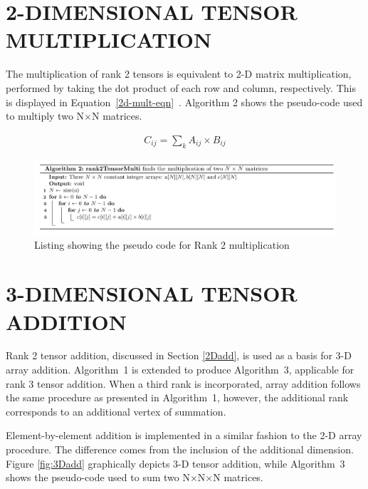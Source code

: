 \section{2-DIMENSIONAL TENSOR MULTIPLICATION} \label{2Dmult}

The multiplication of rank 2 tensors is equivalent to 2-D matrix multiplication, performed by taking the dot product of each row and column, respectively. This is displayed in Equation~\ref{2d-mult-eqn}~\cite{matrix_Multi}. Algorithm 2 shows the pseudo-code used to multiply two N$\times$N matrices. \vspace{-5mm}

\begin{align}
C_{ij} = \sum_{k} A_{ij} \times B_{ij} \label{2d-mult-eqn}
\end{align}

\begin{figure}
\includegraphics[width=2\columnwidth]{build/Algo2.png}
\caption{Listing showing the pseudo code for Rank 2 multiplication}
\end{figure}

\section{3-DIMENSIONAL TENSOR ADDITION} \label{3Dadd}

Rank 2 tensor addition, discussed in Section \ref{2Dadd}, is used as a basis for 3-D array addition. Algorithm~1 is extended to produce Algorithm~3, applicable for rank 3 tensor addition. When a third rank is incorporated, array addition follows the same procedure as presented in Algorithm~1, however, the additional rank corresponds to an additional vertex of summation.

Element-by-element addition is implemented in a similar fashion to the 2-D array procedure. The difference comes from the inclusion of the additional dimension. Figure \ref{fig:3Dadd} graphically depicts 3-D tensor addition, while Algorithm~3 shows the pseudo-code used to sum two N$\times$N$\times$N matrices. \vspace{3mm}

